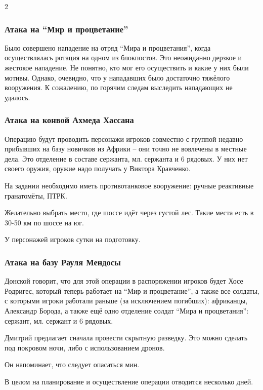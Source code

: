 \documentclass[twoside]{article}
\begin{document}
\begin{multicols}{2}
\subsubsection{Атака на \enquote{Мир и процветание}}\label{pap-attack-donskoy}

Было совершено нападение на отряд \enquote{Мира и процветания}, когда
осуществлялась ротация на одном из блокпостов. Это неожиданно дерзкое и
жестокое нападение. Не понятно, кто мог его осуществить и какие у них
были мотивы. Однако, очевидно, что у нападавших было достаточно тяжёлого
вооружения. К сожалению, по горячим следам выследить нападающих не
удалось.

\subsubsection{Атака на конвой Ахмеда Хассана}\label{hassan-convoy-attack}

Операцию будут проводить персонажи игроков совместно с группой недавно
прибывших на базу новичков из Африки -- они точно не вовлечены в местные
дела. Это отделение в составе сержанта, мл. сержанта и 6 рядовых. У них
нет своего оружия, оружие надо получать у Виктора Кравченко.

На задании необходимо иметь противотанковое вооружение: ручные
реактивные гранатомёты, ПТРК.

Желательно выбрать место, где шоссе идёт через густой лес. Такие места
есть в 30-50 км по шоссе на юг.

У персонажей игроков сутки на подготовку.

\subsubsection{Атака на базу Рауля Мендосы}\label{mendosa-base-attack-2}

Донской говорит, что для этой операции в распоряжении игроков будет Хосе
Родригес, который теперь работает на \enquote{Мир и процветание}, а также все
солдаты, с которыми игроки работали раньше (за исключением погибших):
африканцы, Александр Борода, а также ещё одно отделение солдат \enquote{Мира и
процветания}: сержант, мл. сержант и 6 рядовых.

Дмитрий предлагает сначала провести скрытную разведку. Это можно сделать
под покровом ночи, либо с использованием дронов.

Он напоминает, что следует опасаться мин.

В целом на планирование и осуществление операции отводится несколько
дней.


\end{multicols}
\end{document}
